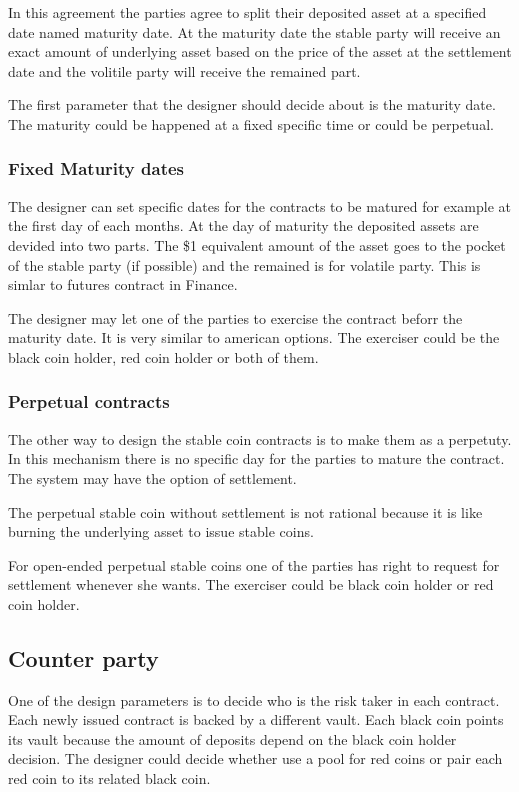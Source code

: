 In this agreement the parties agree to split their deposited asset at a specified date named maturity date. At the maturity date the stable party will receive an exact amount of underlying asset based on the price of the asset at the settlement date and the volitile party will receive the remained part.

The first parameter that the designer should decide about is the maturity date. The maturity could be happened at a fixed specific time or could be perpetual.
\subsubsection{Fixed Maturity dates}
The designer can set specific dates for the contracts to be matured for example at the first day of each months. At the day of maturity the deposited assets are devided into two parts. The \$1 equivalent amount of the asset goes to the pocket of the stable party (if possible) and the remained is for volatile party. This is simlar to futures contract in Finance.

The designer may let one of the parties to exercise the contract beforr the maturity date. It is very similar to american options. The exerciser could be the black coin holder, red coin holder or both of them. 

\subsubsection{Perpetual contracts}
The other way to design the stable coin contracts is to make them as a perpetuty. In this mechanism there is no specific day for the parties to mature the contract. The system may have the option of settlement.

The perpetual stable coin without settlement is not rational because it is like burning the underlying asset to issue stable coins. 

For open-ended perpetual stable coins one of the parties has right to request for settlement whenever she wants. The exerciser could be black coin holder or red coin holder.
\subsection{Counter party}
One of the design parameters is to decide who is the risk taker in each contract. Each newly issued contract is backed by a different vault. Each black coin points its vault because the amount of deposits depend on the black coin holder decision. 
The designer could decide whether use a pool for red coins or pair each red coin to its related black coin.

